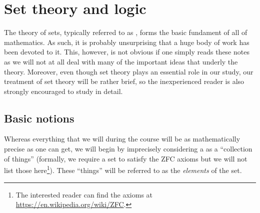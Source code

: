 \section{Set theory and logic}
\label{set-theory}
The theory of sets, typically referred to as , forms the basic fundament of all of mathematics. As such, it is probably unsurprising that a huge body of work has been devoted to it. This, however, is not obvious if one simply reads these notes as we will not at all deal with many of the important ideas that underly the theory. Moreover, even though set theory plays an essential role in our study, our treatment of set theory will be rather brief, so the inexperienced reader is also strongly encouraged to study \cite[\S1]{Mun} in detail.

\subsection{Basic notions}
Whereas everything that we will during the course will be as mathematically precise as one can get, we will begin by imprecisely considering a  as a ``collection of things'' (formally, we require a set to satisfy the ZFC axioms but we will not list those here\footnote{The interested reader can find the axioms at \url{https://en.wikipedia.org/wiki/ZFC}.}). These ``things'' will be referred to as the \emph{elements} of the set.

